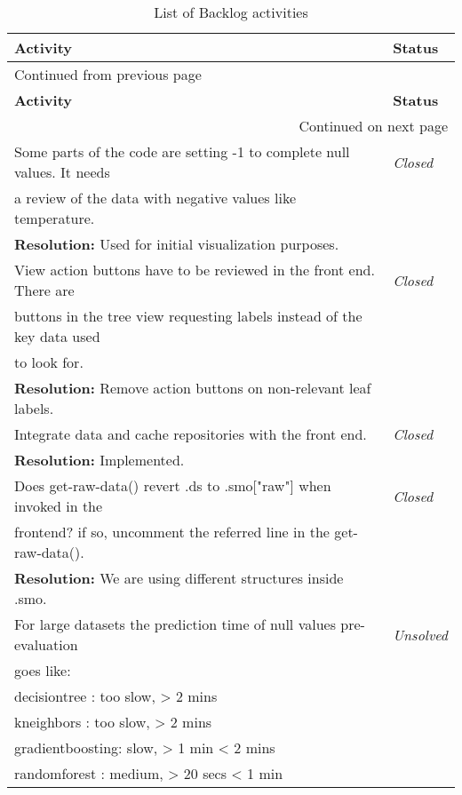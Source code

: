 \documentclass[a4paper]{article}
\begin{document}
\sffamily
\begin{longtable}{ll}
\caption{List of Backlog activities}
\\[0pt]
\hline
\textbf{Activity} & \textbf{Status}\\[0pt]
\hline
\endfirsthead
\multicolumn{2}{l}{Continued from previous page} \\[0pt]
\hline

\textbf{Activity} & \textbf{Status} \\[0pt]

\hline
\endhead
\hline\multicolumn{2}{r}{Continued on next page} \\
\endfoot
\endlastfoot
\hline
Some parts of the code are setting -1 to complete null values. It needs & \emph{Closed}\\[0pt]
a review of the data with negative values like temperature. & \\[0pt]
\textbf{Resolution:} Used for initial visualization purposes. & \\[0pt]
\hline
View action buttons have to be reviewed in the front end. There are & \emph{Closed}\\[0pt]
buttons in the tree view requesting labels instead of the key data used & \\[0pt]
to look for. & \\[0pt]
\textbf{Resolution:} Remove action buttons on non-relevant leaf labels. & \\[0pt]
\hline
Integrate data and cache repositories with the front end. & \emph{Closed}\\[0pt]
\textbf{Resolution:} Implemented. & \\[0pt]
\hline
Does get-raw-data() revert .ds to .smo["raw"] when invoked in the & \emph{Closed}\\[0pt]
frontend? if so, uncomment the referred line in the get-raw-data(). & \\[0pt]
\textbf{Resolution:} We are using different structures inside .smo. & \\[0pt]
\hline
For large datasets the prediction time of null values pre-evaluation & \emph{Unsolved}\\[0pt]
goes like: & \\[0pt]
decisiontree    : too slow,  >   2 mins & \\[0pt]
kneighbors      : too slow,  >   2 mins & \\[0pt]
gradientboosting: slow,      >   1 min  < 2 mins & \\[0pt]
randomforest    : medium,    >  20 secs < 1 min & \\[0pt]

\end{longtable}
\end{document}
